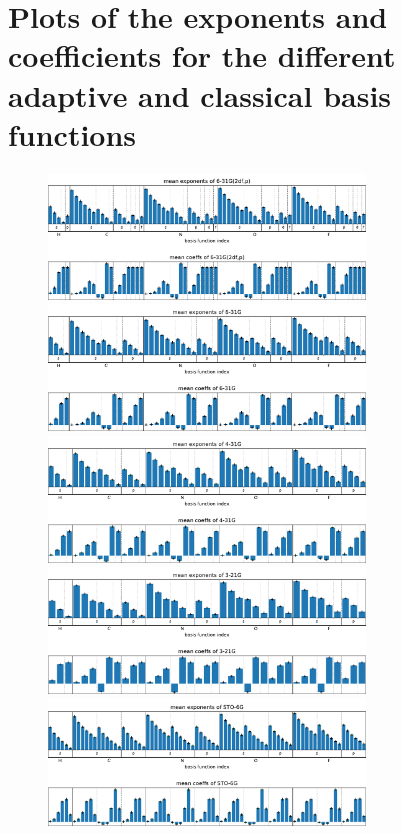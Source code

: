 \section{Plots of the exponents and coefficients for the different adaptive and classical basis functions}
\begin{figure}
    \centering
    \includegraphics[width=0.75\textwidth]{chapters/results/results_images/adaptive_basis_functions/mean_exps_and_coeffs6-31G(2df,p)}
    \includegraphics[width=0.75\textwidth]{chapters/results/results_images/adaptive_basis_functions/mean_exps_and_coeffs6-31G}
    \includegraphics[width=0.75\textwidth]{chapters/results/results_images/adaptive_basis_functions/mean_exps_and_coeffs4-31G}
    \includegraphics[width=0.75\textwidth]{chapters/results/results_images/adaptive_basis_functions/mean_exps_and_coeffs3-21G}
    \includegraphics[width=0.75\textwidth]{chapters/results/results_images/adaptive_basis_functions/mean_exps_and_coeffsSTO-6G}

\end{figure}

